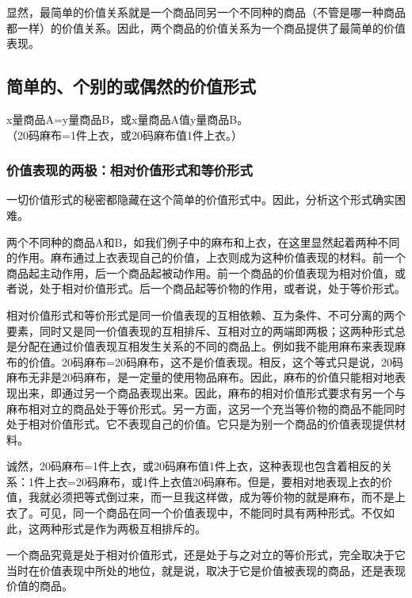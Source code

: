 \documentclass{ctexbook}
\begin{document}
    显然，最简单的价值关系就是一个商品同另一个不同种的商品（不管是哪一种商品都一样）的价值关系。因此，两个商品的价值关系为一个商品提供了最简单的价值表现。

        \subsection{简单的、个别的或偶然的价值形式}

        \begin{center}
            x量商品A=y量商品B，或x量商品A值y量商品B。\\
            （20码麻布=1件上衣，或20码麻布值1件上衣。）
        \end{center}
        
            \subsubsection{价值表现的两极：相对价值形式和等价形式}

            一切价值形式的秘密都隐藏在这个简单的价值形式中。因此，分析这个形式确实困难。
            
            两个不同种的商品A和B，如我们例子中的麻布和上衣，在这里显然起着两种不同的作用。麻布通过上衣表现自己的价值，上衣则成为这种价值表现的材料。前一个商品起主动作用，后一个商品起被动作用。前一个商品的价值表现为相对价值，或者说，处于相对价值形式。后一个商品起等价物的作用，或者说，处于等价形式。
            
            相对价值形式和等价形式是同一价值表现的互相依赖、互为条件、不可分离的两个要素，同时又是同一价值表现的互相排斥、互相对立的两端即两极；这两种形式总是分配在通过价值表现互相发生关系的不同的商品上。例如我不能用麻布来表现麻布的价值。20码麻布=20码麻布，这不是价值表现。相反，这个等式只是说，20码麻布无非是20码麻布，是一定量的使用物品麻布。因此，麻布的价值只能相对地表现出来，即通过另一个商品表现出来。因此，麻布的相对价值形式要求有另一个与麻布相对立的商品处于等价形式。另一方面，这另一个充当等价物的商品不能同时处于相对价值形式。它不表现自己的价值。它只是为别一个商品的价值表现提供材料。
            
            诚然，20码麻布=1件上衣，或20码麻布值1件上衣，这种表现也包含着相反的关系：1件上衣=20码麻布，或1件上衣值20码麻布。但是，要相对地表现上衣的价值，我就必须把等式倒过来，而一旦我这样做，成为等价物的就是麻布，而不是上衣了。可见，同一个商品在同一个价值表现中，不能同时具有两种形式。不仅如此，这两种形式是作为两极互相排斥的。
            
            一个商品究竟是处于相对价值形式，还是处于与之对立的等价形式，完全取决于它当时在价值表现中所处的地位，就是说，取决于它是价值被表现的商品，还是表现价值的商品。
\end{document}
